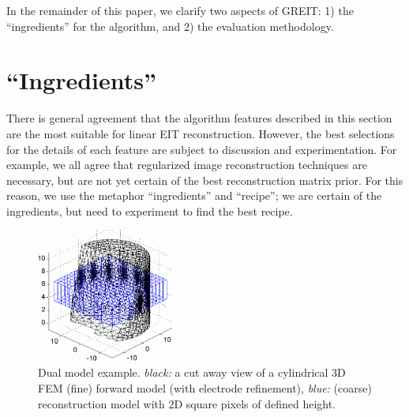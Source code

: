 \documentclass[letterpaper,twocolumn,10pt]{article}
\begin{document}
In the remainder of this paper, we clarify two aspects of GREIT:
1) the ``ingredients'' for the algorithm, and
2) the evaluation methodology.

\section{``Ingredients''}

There is general agreement that the algorithm features
described in this section are the most suitable for
linear EIT reconstruction. However, the best selections
for the details of each feature are subject to discussion
and experimentation. For example, we all agree that
regularized image reconstruction techniques are necessary,
but are not yet certain of the best reconstruction matrix prior.
For this reason, we use the metaphor ``ingredients'' and
``recipe''; we are certain of the ingredients, but need
to experiment to find the best recipe.
\begin{figure}[tbh]
\begin{center}
 \includegraphics[width= 0.4\textwidth, bb=0 0 427 419]{figs/square_mesh03a.png}
\caption{ \label{fig:dual_model}
\small
Dual model example. {\em black:} a cut away view of a
cylindrical 3D FEM (fine) forward model (with electrode
 refinement),
{\em blue:} (coarse) reconstruction model with 2D square
pixels of defined height.%
\vspace{-0.5cm}
}
\end{center}
\end{figure}
\end{document}
